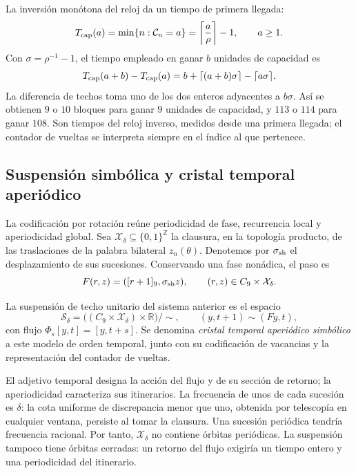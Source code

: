 La inversión monótona del reloj da un tiempo de primera llegada:
\[
 T_{\rm cap}(a)=\min\{n:\mathcal C_n=a\}
 =\left\lceil\frac a\rho\right\rceil-1,
 \qquad a\geq1.
\]
Con \(\sigma=\rho^{-1}-1\), el tiempo empleado en ganar \(b\) unidades
de capacidad es
\[
 T_{\rm cap}(a+b)-T_{\rm cap}(a)
 =b+\lceil(a+b)\sigma\rceil-\lceil a\sigma\rceil.
\]
La diferencia de techos toma uno de los dos enteros adyacentes a
\(b\sigma\). Así se obtienen \(9\) o \(10\) bloques para ganar
\(9\) unidades de capacidad, y \(113\) o \(114\) para ganar \(108\).
Son tiempos del reloj inverso, medidos desde una primera llegada; el
contador de vueltas se interpreta siempre en el índice al que pertenece.

\subsection{Suspensión simbólica y cristal temporal aperiódico}
\label{mono-ampl:cristal}

La codificación por rotación reúne periodicidad de fase, recurrencia local
y aperiodicidad global. Sea \(\mathcal X_\delta\subseteq\{0,1\}^{\mathbb Z}\)
la clausura, en la topología producto, de las traslaciones de la palabra
bilateral \(z_n(\theta)\). Denotemos por \(\sigma_{\rm sh}\) el
desplazamiento de sus sucesiones. Conservando una fase nonádica, el paso es
\[
 F(r,z)=([r+1]_9,\sigma_{\rm sh}z),\qquad
 (r,z)\in C_9\times\mathcal X_\delta.
\]

\begin{definition}
\label{mono-ampl:def-cristal}
La suspensión de techo unitario del sistema anterior es el espacio
\[
 \mathcal S_\delta=
 \bigl((C_9\times\mathcal X_\delta)\times\mathbb R\bigr)/\sim,
 \qquad (y,t+1)\sim(Fy,t),
\]
con flujo \(\Phi_s[y,t]=[y,t+s]\). Se denomina \emph{cristal temporal
aperiódico simbólico} a este modelo de orden temporal, junto con su
codificación de vacancias y la representación del contador de vueltas.
\end{definition}

El adjetivo temporal designa la acción del flujo y de su sección de retorno;
la aperiodicidad caracteriza sus itinerarios. La frecuencia de unos de cada
sucesión es \(\delta\): la cota uniforme de discrepancia menor que uno,
obtenida por telescopía en cualquier ventana, persiste al tomar la clausura.
Una sucesión periódica tendría frecuencia racional. Por tanto,
\(\mathcal X_\delta\) no contiene órbitas periódicas. La suspensión
tampoco tiene órbitas cerradas: un retorno del flujo exigiría un tiempo
entero y una periodicidad del itinerario.

